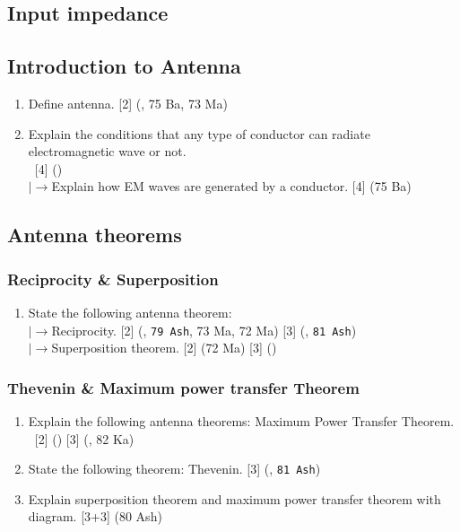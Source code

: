 \documentclass[12pt]{article}
\newcommand{\lb}{\\$\left|\rightarrow\right.$}
\newcommand{\enter}{\\\textcolor{white}{1}}
\begin{document}
    \subsection{Input impedance}

  \subsection{Introduction to Antenna}
    \begin{enumerate}
      \item Define antenna. \hfill [2] (, 75 Ba, 73 Ma)

      \item Explain the conditions that any type of conductor can radiate electromagnetic wave or not.
        \enter\hfill [4] ()
        \lb Explain how EM waves are generated by a conductor. \hfill [4] (75 Ba)
    \end{enumerate}

  \subsection{Antenna theorems}
    \subsubsection{Reciprocity \& Superposition}
      \begin{enumerate}
        \item State the following antenna theorem:
          \lb Reciprocity. \hfill [2] (, \texttt{79 Ash}, 73 Ma, 72 Ma) [3] (, \texttt{81 Ash})
          \lb Superposition theorem. \hfill [2] (72 Ma) [3] ()
      \end{enumerate}

    \subsubsection{Thevenin \& Maximum power transfer Theorem}
      \begin{enumerate}
        \item Explain the following antenna theorems: Maximum Power Transfer Theorem. 
          \enter\hfill [2] () [3] (, 82 Ka)
        
        \item State the following theorem: Thevenin. \hfill [3] (, \texttt{81 Ash})

        \item Explain superposition theorem and maximum power transfer theorem with diagram. \hfill [3+3] (80 Ash)
      \end{enumerate}
\end{document}
